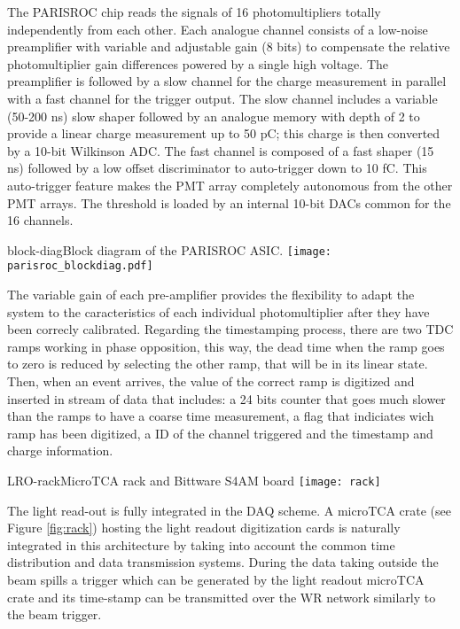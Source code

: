 The PARISROC chip reads the signals of 16 photomultipliers totally independently from each
other. Each analogue channel consists of a low-noise preamplifier with variable and adjustable
gain (8 bits) to compensate the relative photomultiplier gain differences powered by a single high
voltage. The preamplifier is followed by a slow channel for the charge measurement in parallel
with a fast channel for the trigger output. The slow channel includes a variable (50-200 ns) slow
shaper followed by an analogue memory with depth of 2 to provide a linear charge measurement
up to 50 pC; this charge is then converted by a 10-bit Wilkinson ADC. The fast channel is
composed of a fast shaper (15 ns) followed by a low offset discriminator to auto-trigger down to
10 fC. This auto-trigger feature makes the PMT array completely autonomous from the other
PMT arrays. The threshold is loaded by an internal 10-bit DACs common for the 16 channels.


\begin{cdrfigure}{block-diag}{Block diagram of the PARISROC ASIC.}
 \texttt{[image: parisroc\_blockdiag.pdf]}  
\end{cdrfigure}


The variable gain of each pre-amplifier provides the flexibility to adapt the system to the caracteristics of each individual photomultiplier after they have been correcly calibrated. Regarding the timestamping process, there are two TDC ramps working in phase opposition, this way, the dead time when the ramp goes to zero is reduced by selecting the other ramp, that will be in its linear state. Then, when an event arrives, the value of the correct ramp is digitized and inserted in stream of data that includes: a 24 bits counter that goes much slower than the ramps to have a coarse time measurement, a flag that indiciates wich ramp has been digitized, a ID of the channel triggered and the timestamp and charge information.

\begin{cdrfigure}{LRO-rack}{MicroTCA rack and Bittware S4AM board}
 \texttt{[image: rack]}  
\end{cdrfigure}

The light read-out is fully integrated in the DAQ scheme. A microTCA crate (see Figure \ref{fig:rack}) hosting the light readout digitization cards is naturally integrated in this architecture by taking into account the common time distribution and data transmission systems.  During the data taking outside the beam spills a trigger which can be generated by the light readout microTCA crate and its time-stamp can be transmitted over the WR network similarly to the beam trigger. 

